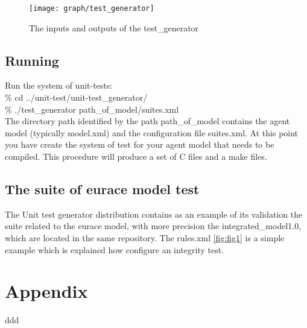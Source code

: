 \documentclass[a4paper,10pt]{article}
\begin{document}
 \begin{figure}
 \label{fig:fig5}
\centering
\texttt{[image: graph/test\_generator]} 
\caption{The inputs and outputs of the test\_generator }
\end{figure}
\subsection{Running}
Run the system of unit-tests:\\
\% cd ../unit-test/unit-test\_generator/\\
\% ./test\_generator  path\_of\_model/suites.xml \\
The directory path identified by the path path\_of\_model contains the agent model (typically model.xml) and the configuration file suites.xml.
At this point you have create the system of test for your agent model that  needs to be compiled. This procedure will produce a set of C files and a make files.
\subsection{The suite of eurace model test }
The Unit test generator distribution contains as an  example of its validation  the suite related to the eurace model, with more precision the integrated\_model1.0, which are located in the same repository.
The rules.xml \ref{fig:fig1} is a simple example which is explained how configure an integrity test.
\section{Appendix}
ddd
\end{document}
